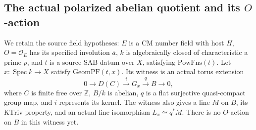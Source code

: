 \subsection{The actual polarized abelian quotient and its \(O\)-action}
\label{subsec:faithful-actual-abelian-quotient}

We retain the source field hypotheses: \(E\) is a CM number
field with host \(H\), \(O=\mathcal O_E\) has its specified
involution \(\bar a\), \(k\) is algebraically closed of
characteristic a prime \(p\), and \(t\) is a source
\(\mathrm{SAB}\) datum over \(X\), satisfying
\(\mathrm{PowFns}(t)\).
Let \(x:\operatorname{Spec}k\to X\) satisfy
\(\mathrm{GeomPF}(t,x)\).
Its witness is an actual torus extension
\[
       0\longrightarrow D(C)\stackrel i\longrightarrow G_x
                       \stackrel q\longrightarrow B\longrightarrow0,
 \tag{AQ1}\label{eq:faithful-geometric-quotient-extension}
\]
where \(C\) is finite free over \(\mathbb Z\), \(B/k\) is
abelian, \(q\) is a flat surjective quasi-compact group map,
and \(i\) represents its kernel.  The witness also gives a
line \(M\) on \(B\), its \(\mathrm{KTriv}\) property, and an
actual line isomorphism \(L_x\simeq q^*M\).
There is no \(O\)-action on \(B\) in this witness yet.

